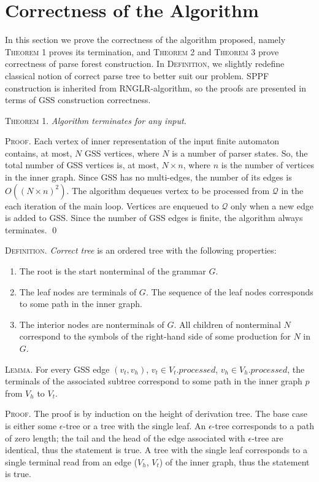 \section{Correctness of the Algorithm}
In this section we prove the correctness of the algorithm proposed, namely \textsc{Theorem 1} proves its termination,
and \textsc{Theorem 2} and \textsc{Theorem 3} prove correctness of parse forest construction.
In \textsc{Definition}, we slightly redefine classical notion of correct parse tree to better suit our problem. 
SPPF construction is inherited from RNGLR-algorithm, so the proofs are presented
in terms of GSS construction correctness. 

\textsc{Theorem 1.}
\textit{Algorithm terminates for any input.}

\textsc{Proof.}
Each vertex of inner representation of the input finite automaton contains, at most, 
$N$ GSS vertices, where $N$ is a number of parser states. So, the total number of 
GSS vertices is, at most, $N\times n$, where $n$ is the number of vertices in the inner graph. 
Since GSS has no multi-edges, the number of its edges is $O((N\times n)^2)$. The algorithm 
dequeues vertex to be processed from $\mathcal Q$ in the each iteration of the 
main loop. Vertices are enqueued to $\mathcal Q$ only when a new edge is added to GSS. Since the number of 
GSS edges is finite, the algorithm always terminates. \qed

\textsc{Definition.} 
\emph{Correct tree} is an ordered tree with the following properties:
\begin{enumerate}
  \item The root is the start nonterminal of the grammar $G$.
  \item The leaf nodes are terminals of $G$. The sequence of the leaf nodes 
        corresponds to some path in the inner graph. 
  \item The interior nodes are nonterminals of $G$. All children of nonterminal 
        $N$ correspond to the symbols of the right-hand side of some production for $N$ in $G$.
\end{enumerate}

\textsc{Lemma.}
For every GSS edge $(v_{t}, v_{h})$, $v_{t} \in V_{t}.processed$, $v_{h} \in V_{h}.processed$, 
the terminals of the associated subtree correspond to some path in the inner graph $p$ 
from $V_{h}$ to $V_{t}$.

\textsc{Proof.}
The proof is by induction on the height of derivation tree. 
The base case is either some $\epsilon$-tree or a tree with the single leaf. An $\epsilon$-tree corresponds 
to a path of zero length; the tail and the head of the edge associated with $\epsilon$-tree are identical, 
thus the statement is true. A tree with the single leaf corresponds to a single terminal read from an edge 
($V_{h}$, $V_{t}$) of the inner graph, thus the statement is true.

